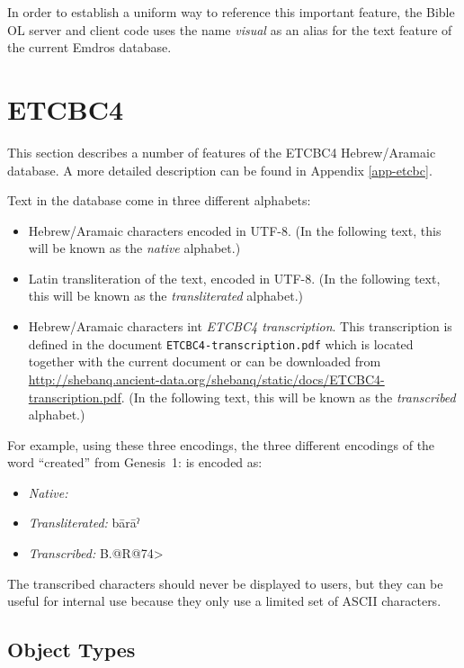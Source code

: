 \documentclass[11pt,oneside,a4paper]{memoir}
\newcommand*{\bibleref}[3]{#1~#2\thinspace:\thinspace#3}
\newcommand{\heb}[1]{{\RL {\ezr #1}}}
\begin{document}
In order to establish a uniform way to reference this important feature, the Bible OL server and
client code uses the name \emph{visual} as an alias for the text feature of the current Emdros
database.



\section{ETCBC4}

This section describes a number of features of the ETCBC4 Hebrew/Aramaic database. A more detailed
description can be found in Appendix \ref{app-etcbc}.

Text in the database come in three different alphabets:

\begin{itemize}
\item Hebrew/Aramaic characters encoded in UTF-8. (In the following text, this will be known as the
  \emph{native} alphabet.)
\item Latin transliteration of the text, encoded in UTF-8. (In the following text, this will be
  known as the \emph{transliterated} alphabet.)
\item Hebrew/Aramaic characters int \emph{ETCBC4 transcription}. This transcription is defined in
  the document \texttt{ETCBC4-transcription.pdf} which is located together with the current document
  or can be downloaded from
  \url{http://shebanq.ancient-data.org/shebanq/static/docs/ETCBC4-transcription.pdf}. (In the
  following text, this will be known as the \emph{transcribed} alphabet.)
\end{itemize}

For example, using these three encodings, the three different encodings of the word ``created'' from
\bibleref{Genesis}{1}{1} is encoded as:

\begin{itemize}
\item \emph{Native:} \heb{בָּרָ֣א}
\item \emph{Transliterated:} bārāˀ
\item \emph{Transcribed:} B.@R@74>
\end{itemize}

The transcribed characters should never be displayed to users, but they can be useful for internal
use because they only use a limited set of ASCII characters.


\subsection{Object Types}
\end{document}
